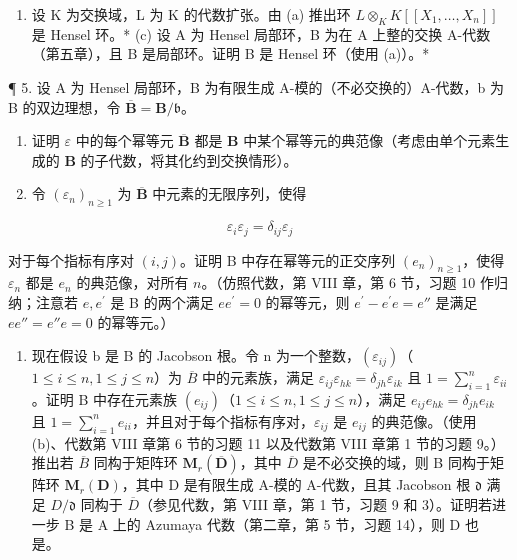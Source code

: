 \begin{enumerate}
\def\labelenumi{(\alph{enumi})}
\setcounter{enumi}{1}
\tightlist
\item
  设 K 为交换域，L 为 K 的代数扩张。由 (a) 推出环 \(L \otimes_{K} K[[X_{1}, \ldots, X_{n}]]\) 是 Hensel 环。* (c) 设 A 为 Hensel 局部环，B 为在 A 上整的交换 A-代数（第五章），且 B 是局部环。证明 B 是 Hensel 环（使用 (a)）。*
\end{enumerate}

¶ 5. 设 A 为 Hensel 局部环，B 为有限生成 A-模的（不必交换的）A-代数，b 为 B 的双边理想，令 \(\overline{\mathbf{B}} = \mathbf{B} / \mathfrak{b}\)。

\begin{enumerate}
\def\labelenumi{(\alph{enumi})}
\item
  证明 \(\varepsilon\) 中的每个幂等元 \(\overline{\mathbf{B}}\) 都是 \(\mathbf{B}\) 中某个幂等元的典范像（考虑由单个元素生成的 \(\mathbf{B}\) 的子代数，将其化约到交换情形）。
\item
  令 \((\varepsilon_{n})_{n\geqslant 1}\) 为 \(\overline{\mathbf{B}}\) 中元素的无限序列，使得
\end{enumerate}

\[
\varepsilon_ {i} \varepsilon_ {j} = \delta_ {i j} \varepsilon_ {j}
\]

对于每个指标有序对 \((i,j)\)。证明 B 中存在幂等元的正交序列 \((e_n)_{n\geq 1}\)，使得 \(\varepsilon_{n}\) 都是 \(e_n\) 的典范像，对所有 \(n\)。（仿照代数，第 VIII 章，第 6 节，习题 10 作归纳；注意若 \(e,e^{\prime}\) 是 B 的两个满足 \(ee^{\prime} = 0\) 的幂等元，则 \(e^{\prime} - e^{\prime}e = e''\) 是满足 \(ee'' = e''e = 0\) 的幂等元。）

\begin{enumerate}
\def\labelenumi{(\alph{enumi})}
\setcounter{enumi}{2}
\tightlist
\item
  现在假设 b 是 B 的 Jacobson 根。令 n 为一个整数，\((\varepsilon_{ij})\)（\(1 \leqslant i \leqslant n, 1 \leqslant j \leqslant n\)）为 \(\overline{B}\) 中的元素族，满足 \(\varepsilon_{ij}\varepsilon_{hk} = \delta_{jh}\varepsilon_{ik}\) 且 \(1 = \sum_{i=1}^{n} \varepsilon_{ii}\)。证明 B 中存在元素族 \((e_{ij})\)（\(1 \leqslant i \leqslant n, 1 \leqslant j \leqslant n\)），满足 \(e_{ij}e_{hk} = \delta_{jh}e_{ik}\) 且 \(1 = \sum_{i=1}^{n} e_{ii}\)，并且对于每个指标有序对，\(\varepsilon_{ij}\) 是 \(e_{ij}\) 的典范像。（使用 (b)、代数第 VIII 章第 6 节的习题 11 以及代数第 VIII 章第 1 节的习题 9。）推出若 \(\overline{B}\) 同构于矩阵环 \(\mathbf{M}_{r}(\overline{\mathbf{D}})\)，其中 \(\overline{D}\) 是不必交换的域，则 B 同构于矩阵环 \(\mathbf{M}_{r}(\mathbf{D})\)，其中 D 是有限生成 A-模的 A-代数，且其 Jacobson 根 \(\mathfrak{d}\) 满足 \(D/\mathfrak{d}\) 同构于 \(\overline{D}\)（参见代数，第 VIII 章，第 1 节，习题 9 和 3）。证明若进一步 B 是 A 上的 Azumaya 代数（第二章，第 5 节，习题 14），则 D 也是。~
\end{enumerate}

